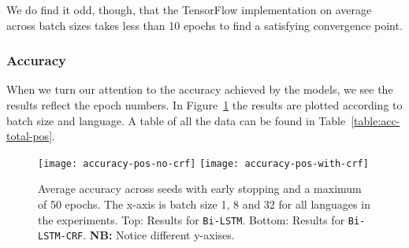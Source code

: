 We do find it odd, though, that the TensorFlow implementation on average across
batch sizes takes less than 10 epochs to find a satisfying convergence point.

\subsubsection*{Accuracy}

When we turn our attention to the accuracy achieved by the models, we see the
results reflect the epoch numbers. In
Figure~\ref{chart:acc-by-batch-and-lang-pos} the results are plotted
according to batch size and language. A table of all the data can be found in
Table~\ref{table:acc-total-pos}.

\begin{figure}[h!]
    \texttt{[image: accuracy-pos-no-crf]}
    \texttt{[image: accuracy-pos-with-crf]}
    \caption{Average accuracy across seeds with early stopping and a maximum of
        50 epochs. The x-axis is batch size 1, 8 and 32 for all languages in the
        experiments. Top: Results for \texttt{Bi-LSTM}. Bottom: Results for
    \texttt{Bi-LSTM-CRF}. \textbf{NB:} Notice different y-axises.
    }\label{chart:acc-by-batch-and-lang-pos}
\end{figure}

